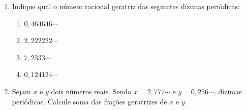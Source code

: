 \begin{enumerate}
 \item Indique qual o número racional geratriz das seguintes dízimas periódicas:
 \begin{enumerate}
 \item $0,464646 \cdots$
 \item $2,222222 \cdots$
 \item $7,2333 \cdots$
 \item $0,124124 \cdots$
 \end{enumerate}

 \item Sejam $x$ e $y$ dois números reais. Sendo $x = 2,777 \cdots$ e $y = 0,256 \cdots$, dízimas periódicas. Calcule soma das frações geratrizes de $x$ e $y$.

\end{enumerate}
